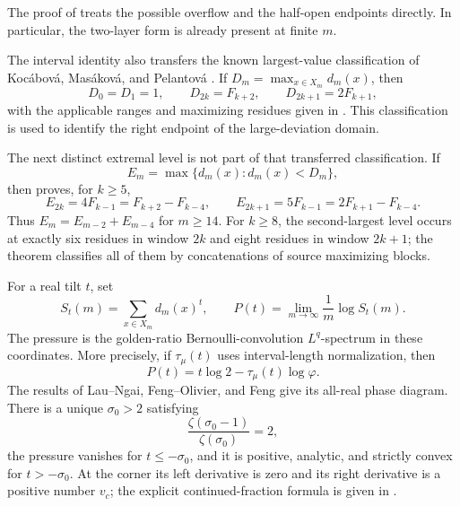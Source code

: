 The proof of  treats the possible overflow
and the half-open endpoints directly.  In particular, the two-layer form is
already present at finite \(m\).

The interval identity also transfers the known largest-value classification
of Koc\'abov\'a, Mas\'akov\'a, and Pelantov\'a
\cite{KocabovaMasakovaPelantova2005}.  If
\(D_m=\max_{x\in X_m}d_m(x)\), then
\[
 D_0=D_1=1,
 \qquad D_{2k}=F_{k+2},
 \qquad D_{2k+1}=2F_{k+1},
\]
with the applicable ranges and maximizing residues given in
.  This classification is used to
identify the right endpoint of the large-deviation domain.

The next distinct extremal level is not part of that transferred
classification.  If
\[
 E_m=\max\{d_m(x):d_m(x)<D_m\},
\]
then  proves, for \(k\ge5\),
\[
 E_{2k}=4F_{k-1}=F_{k+2}-F_{k-4},\qquad
 E_{2k+1}=5F_{k-1}=2F_{k+1}-F_{k-4}.
\]
Thus \(E_m=E_{m-2}+E_{m-4}\) for \(m\ge14\).  For \(k\ge8\), the
second-largest level occurs at exactly six residues in window \(2k\) and
eight residues in window \(2k+1\); the theorem classifies all of them by
concatenations of source maximizing blocks.

For a real tilt \(t\), set
\[
 S_t(m)=\sum_{x\in X_m}d_m(x)^t,
 \qquad
 P(t)=\lim_{m\to\infty}\frac1m\log S_t(m).
\]
The pressure is the golden-ratio Bernoulli-convolution \(L^q\)-spectrum in
these coordinates.  More precisely, if \(\tau_\mu(t)\) uses interval-length
normalization, then
\begin{equation}
 P(t)=t\log2-\tau_\mu(t)\log\varphi.
 \label{eq:erdos-pressure-dictionary}
\end{equation}
The results of Lau--Ngai, Feng--Olivier, and Feng
\cite{LauNgai1998,FengOlivier2003,Feng2005} give its all-real phase diagram.
There is a unique \(\sigma_0>2\) satisfying
\[
 \frac{\zeta(\sigma_0-1)}{\zeta(\sigma_0)}=2,
\]
the pressure vanishes for \(t\le-\sigma_0\), and it is positive, analytic,
and strictly convex for \(t>-\sigma_0\).  At the corner its left derivative
is zero and its right derivative is a positive number \(v_c\); the explicit
continued-fraction formula is given in .

